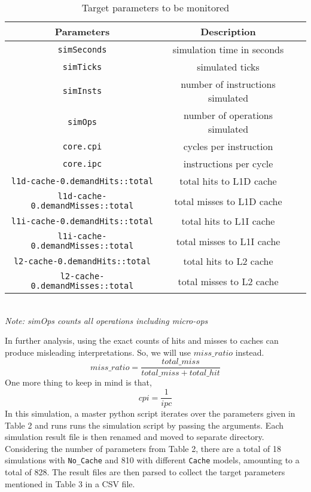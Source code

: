 \begin{table}[h]
\centering
\begin{tabular}{|c|c|c|}
    \hline
    Parameters                                                       & Description\\ \hline
    \texttt{simSeconds}                                              & simulation time in seconds  \\ 
    \texttt{simTicks}                                                & simulated ticks \\
    \texttt{simInsts}                                                & number of instructions simulated \\
    \texttt{simOps}                                                  & number of operations simulated\\
    \texttt{core.cpi}                                                & cycles per instruction \\ 
    \texttt{core.ipc}                                                & instructions per cycle\\
    \texttt{l1d-cache-0.demandHits::total}                           & total hits to L1D cache  \\ 
    \texttt{l1d-cache-0.demandMisses::total}                         & total misses to L1D cache \\
    \texttt{l1i-cache-0.demandHits::total}                           & total hits to L1I cache \\
    \texttt{l1i-cache-0.demandMisses::total}                         & total misses to L1I cache\\
    \texttt{l2-cache-0.demandHits::total}                            & total hits to L2 cache \\ 
    \texttt{l2-cache-0.demandMisses::total}                          & total misses to L2 cache\\ \hline
    \end{tabular}
    \\
    \textit{Note: simOps counts all operations including micro-ops}
    \caption{Target parameters to be monitored}
\end{table}
In further analysis, using the exact counts of hits and misses to caches can produce misleading interpretations.
So, we will use $miss\_ratio$ instead.
\[
miss\_ratio = \frac{total\_miss}{total\_miss+total\_hit}
\]
One more thing to keep in mind is that, 
\[
cpi = \frac{1}{ipc}
\]
In this simulation, a master python script iterates over the parameters given in Table 2 and runs runs the
simulation script by passing the arguments. Each simulation result file is then renamed and moved to separate
directory. Considering the number of parameters from Table 2, there are a total of 18 simulations with
\texttt{No\_Cache} and 810 with different \texttt{Cache} models, amounting to a total of 828. The result files
are then parsed to collect the target parameters mentioned in Table 3 in  a CSV file.
